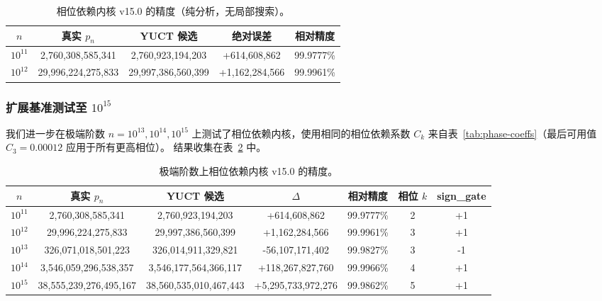 \documentclass[11pt,a4paper]{article}
\begin{document}
	\begin{table}[htbp]
		\centering
		\caption{相位依赖内核 v15.0 的精度（纯分析，无局部搜索）。}
		\label{tab:benchmark-v15}
		\begin{tabular}{c c c c c}
			\toprule
			\(n\) & 真实 \(p_n\) & YUCT 候选 & 绝对误差 & 相对精度 \\
			\midrule
			\(10^{11}\) & 2,760,308,585,341 & 2,760,923,194,203 & +614,608,862 & 99.9777\% \\
			\(10^{12}\) & 29,996,224,275,833 & 29,997,386,560,399 & +1,162,284,566 & 99.9961\% \\
			\bottomrule
		\end{tabular}
	\end{table}
	
	\subsubsection{扩展基准测试至 \(10^{15}\)}
	
	我们进一步在极端阶数
	\(n = 10^{13}, 10^{14}, 10^{15}\) 上测试了相位依赖内核，使用相同的相位依赖系数
	\(C_k\) 来自表~\ref{tab:phase-coeffs}（最后可用值
	\(C_3 = 0.00012\) 应用于所有更高相位）。
	结果收集在表~\ref{tab:benchmark-extreme} 中。
	
	\begin{table}[htbp]
		\centering
		\scriptsize
		\caption{极端阶数上相位依赖内核 v15.0 的精度。}
		\label{tab:benchmark-extreme}
		\begin{tabular}{c c c c c c c}
			\toprule
			\(n\) & 真实 \(p_n\) & YUCT 候选 & \(\Delta\) & 相对精度 & 相位 \(k\) & sign\_gate \\
			\midrule
			\(10^{11}\) & 2,760,308,585,341 & 2,760,923,194,203 & +614,608,862   & 99.9777\% & 2 & +1 \\
			\(10^{12}\) & 29,996,224,275,833 & 29,997,386,560,399 & +1,162,284,566 & 99.9961\% & 3 & +1 \\
			\(10^{13}\) & 326,071,018,501,223 & 326,014,911,329,821 & -56,107,171,402 & 99.9827\% & 3 & -1 \\
			\(10^{14}\) & 3,546,059,296,538,357 & 3,546,177,564,366,117 & +118,267,827,760 & 99.9966\% & 4 & +1 \\
			\(10^{15}\) & 38,555,239,276,495,167 & 38,560,535,010,467,443 & +5,295,733,972,276 & 99.9862\% & 5 & +1 \\
			\bottomrule
		\end{tabular}
	\end{table}
	
\end{document}
